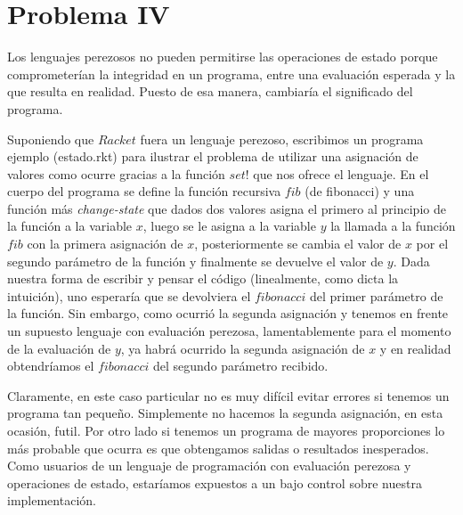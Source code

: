 \documentclass[12pt]{article}
\begin{document}
\section*{Problema IV}
Los lenguajes perezosos no pueden permitirse las operaciones de estado porque comprometerían la integridad en un programa, entre una evaluación
esperada y la que resulta en realidad. Puesto de esa manera, cambiaría el significado del programa.
\par 
Suponiendo que $Racket$ fuera un lenguaje perezoso, escribimos un programa ejemplo (estado.rkt) para ilustrar el problema de utilizar una asignación de valores
como ocurre gracias a la función $set!$ que nos ofrece el lenguaje.
En el cuerpo del programa se define la función recursiva $fib$ (de fibonacci) y una función más \textit{change-state} que dados dos valores asigna el primero al principio de la función a la variable $x$, luego se le asigna a la variable $y$ la llamada a la función $fib$ con la primera asignación de $x$, posteriormente se cambia el valor de $x$ por el segundo parámetro de la función y finalmente se devuelve el valor de $y$. Dada nuestra forma de escribir y pensar el código (linealmente, como dicta la intuición), uno esperaría que se devolviera el $fibonacci$ del primer parámetro de la función. Sin embargo, como ocurrió la segunda asignación y tenemos en frente un supuesto lenguaje con evaluación perezosa, lamentablemente para el momento de la evaluación de $y$, ya habrá ocurrido la segunda asignación de $x$ y en realidad obtendríamos el $fibonacci$ del segundo parámetro recibido.\par
Claramente, en este caso particular no es muy difícil evitar errores si tenemos un programa tan pequeño. Simplemente no hacemos la segunda asignación, en esta ocasión, futil. Por otro lado si tenemos un programa de
mayores proporciones lo más probable que ocurra es que obtengamos salidas o resultados inesperados. Como usuarios de un lenguaje de programación con evaluación perezosa y operaciones de estado, estaríamos expuestos a un bajo control sobre nuestra implementación.
\end{document}
